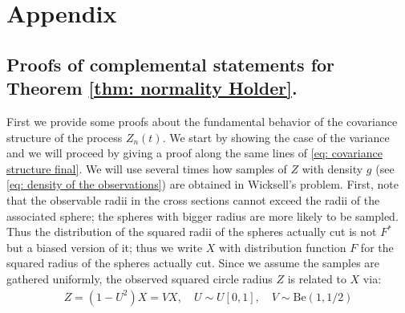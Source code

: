 \section{Appendix}\label{sec: appendix chapter2}  %

\subsection{Proofs of complemental statements for Theorem \ref{thm: normality Holder}.}\label{subsec: proofs lemmas thm normality holder}%
First we provide some proofs about the fundamental behavior of the covariance structure of the process $Z_n(t)$. We start by showing the case of the variance and we will proceed by giving a proof along the same lines of \eqref{eq: covariance structure final}. We will use several times how samples of $Z$ with density $g$ (see \eqref{eq: density of the observations}) are obtained in Wicksell's problem. First, note that the observable radii in the cross sections cannot exceed the radii of the associated sphere; the spheres with bigger radius are more likely to be sampled. Thus the distribution of the squared radii of the spheres actually cut is not $F^*$ but a biased version of it; thus we write $X$ with distribution function $F$ for the squared radius of the spheres actually cut. Since we assume the samples are gathered uniformly, the observed squared circle radius $Z$ is related to $X$ via:
\begin{align}\label{eq: sampling of Z}
    Z = (1-U^2) X = V X, \quad U \sim U[0,1], \quad V \sim \mathrm{Be}(1,1/2)
\end{align}

